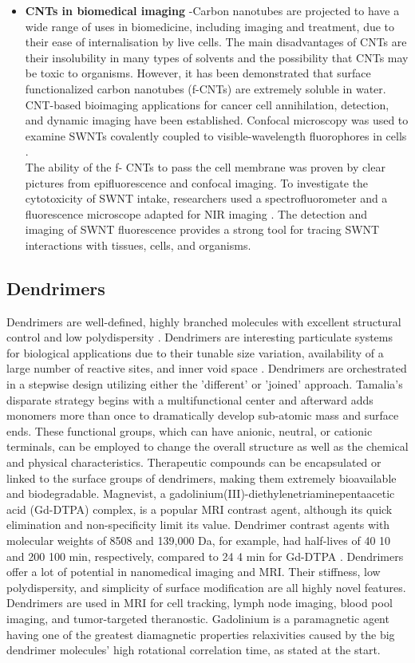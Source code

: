 \documentclass[12pt]{article}
\begin{document}
\begin{itemize}
    \item \textbf{CNTs in biomedical imaging } -Carbon nanotubes are projected to have a wide range of uses in biomedicine, including imaging and treatment, due to their ease of internalisation by live cells. The main disadvantages of CNTs are their insolubility in many types of solvents and the possibility that CNTs may be toxic to organisms. However, it has been demonstrated that surface functionalized carbon nanotubes (f-CNTs) are extremely soluble in water. CNT-based bioimaging applications for cancer cell annihilation, detection, and dynamic imaging have been established. Confocal microscopy was used to examine SWNTs covalently coupled to visible-wavelength fluorophores in cells . \\The ability of the f- CNTs to pass the cell membrane was proven by clear pictures from epifluorescence and confocal imaging. To investigate the cytotoxicity of SWNT intake, researchers used a spectrofluorometer and a fluorescence microscope adapted for NIR imaging . The detection and imaging of SWNT fluorescence provides a strong tool for tracing SWNT interactions with tissues, cells, and organisms.
\end{itemize}

\subsection*{Dendrimers}
Dendrimers are well-defined, highly branched molecules with excellent structural control and low polydispersity . Dendrimers are interesting particulate systems for biological applications due to their tunable size variation, availability of a large number of reactive sites, and inner void space . Dendrimers are orchestrated in a stepwise design utilizing either the 'different' or 'joined' approach. Tamalia's disparate strategy begins with a multifunctional center and afterward adds monomers more than once to dramatically develop sub-atomic mass and surface ends. These functional groups, which can have anionic, neutral, or cationic terminals, can be employed to change the overall structure as well as the chemical and physical characteristics. Therapeutic compounds can be encapsulated or linked to the surface groups of dendrimers, making them extremely bioavailable and biodegradable.
Magnevist, a gadolinium(III)-diethylenetriaminepentaacetic acid (Gd-DTPA) complex, is a popular MRI contrast agent, although its quick elimination and non-specificity limit its value. Dendrimer contrast agents with molecular weights of 8508 and 139,000 Da, for example, had half-lives of 40 10 and 200 100 min, respectively, compared to 24 4 min for Gd-DTPA . Dendrimers offer a lot of potential in nanomedical imaging and MRI. Their stiffness, low polydispersity, and simplicity of surface modification are all highly novel features.
Dendrimers are used in MRI for cell tracking, lymph node imaging, blood pool imaging, and tumor-targeted theranostic. Gadolinium is a paramagnetic agent having one of the greatest diamagnetic properties relaxivities caused by the big dendrimer molecules' high rotational correlation time, as stated at the start.
\end{document}
